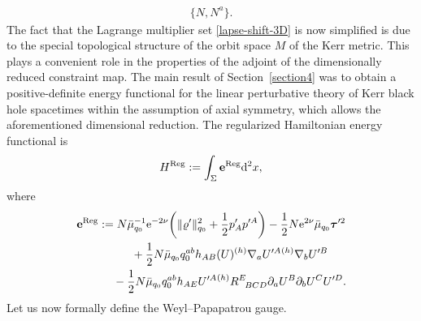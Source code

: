 \documentclass[pdftex]{sigma}
\def\ptl{\partial}%
\def\mbo#1{\boldsymbol{#1}}%
\def\grad{{\nabla}}%
\newcommand{\leftexp}[2]{{\vphantom{#2}}^{#1}{#2}}
\def\halb{\frac{1}{2}}%
\numberwithin{equation}{section}
\begin{document}
	\begin{align} \label{lapse-shift-3D}
	\{ N, N^a \}.
	\end{align}
	The fact that the Lagrange multiplier set \eqref{lapse-shift-3D} is now simplified is due to the special topological
	structure of the orbit space $M$ of the Kerr metric. This plays a convenient role in the properties of the adjoint of the dimensionally reduced constraint map.
	The main result of Section~\ref{section4} was to obtain a positive-definite energy functional for the linear perturbative theory of Kerr black hole spacetimes within the assumption of axial symmetry, which allows the aforementioned dimensional reduction. The regularized Hamiltonian energy functional is
\begin{align*}
	H^{{\rm Reg}} := \int_{\Sigma} \mathbf{e}^{{\rm Reg}} {\rm d}^2x,
	\end{align*}
where
	\begin{gather*}
	\mathbf{e}^{{\rm Reg}} := N \bar{\mu}^{-1}_{q_0} {\rm e}^{-2 \nu} \biggl(\Vert \varrho' \Vert_{q_0}^2 + \halb p'_A p'^A\biggr) - \halb N {\rm e}^{2 \nu} \bar{\mu}_{q_0} \mbo{\tau}'^2 \notag\\
	\hphantom{\mathbf{e}^{{\rm Reg}} :=}{}+ \halb N \bar{\mu}_{q_0} q^{ab}_0 h_{AB}(U) \leftexp{(h)}{\grad}_a U'^A \leftexp{(h)}{\grad}_b U'^B \notag\\
	\hphantom{\mathbf{e}^{{\rm Reg}} :=}{}- \halb N \bar{\mu}_{q_0} q_0^{ab} h_{AE} U'^A \leftexp{(h)}{R}^E_{\,\,\,\, BCD} \ptl_a U^B \ptl_b U^C U'^D.
	\end{gather*}
	Let us now formally define the Weyl--Papapatrou gauge.
\end{document}
